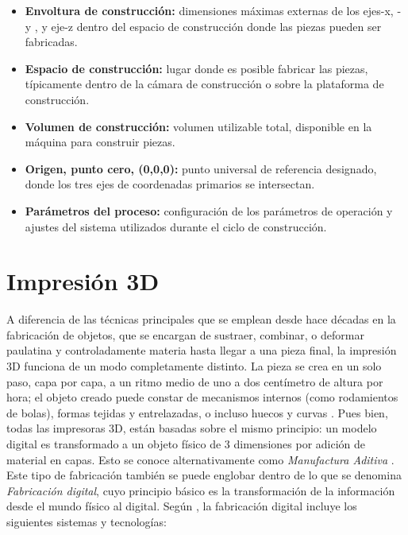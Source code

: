 \begin{itemize}
\item \textbf{Envoltura de construcción:} dimensiones máximas externas de los ejes-x, -y , y eje-z dentro del espacio de construcción donde las piezas pueden ser fabricadas.
\item \textbf{Espacio de construcción:} lugar donde es posible fabricar las piezas, típicamente dentro de la cámara de construcción o sobre la plataforma de construcción.
\item \textbf{Volumen de construcción:} volumen utilizable total, disponible en la máquina para construir piezas.
\item \textbf{Origen, punto cero, (0,0,0):} punto universal de referencia designado, donde los tres ejes de coordenadas primarios se intersectan. 
\item \textbf{Parámetros del proceso:} configuración de los parámetros de operación y ajustes del sistema utilizados durante el ciclo de construcción.
\end{itemize}

\pagebreak

\section{Impresión 3D}

A diferencia de las técnicas principales que se emplean desde hace décadas en la fabricación de objetos, que se encargan de sustraer, combinar, o deformar paulatina y controladamente materia hasta llegar a una pieza final, la impresión 3D funciona de un modo completamente distinto. La pieza se crea en un solo paso, capa por capa, a un ritmo medio de uno a dos centímetro de altura por hora; el objeto creado puede constar de mecanismos internos (como rodamientos de bolas), formas tejidas y entrelazadas, o incluso huecos y curvas \citep{Berchon2014}. Pues bien, todas las impresoras 3D, están basadas sobre el mismo principio: un modelo digital es transformado a un objeto físico de 3 dimensiones por adición de material en capas. Esto se conoce alternativamente como \textit{Manufactura Aditiva} \citep{tresdhub2018}. Este tipo de fabricación también se puede englobar dentro de lo que se denomina \textit{Fabricación digital}, cuyo principio básico es la transformación de la información  desde el mundo físico al digital. Según \citep{jorquera2016}, la fabricación digital incluye los siguientes sistemas y tecnologías:\\
 

